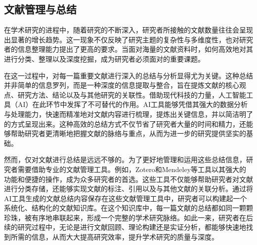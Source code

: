 \subsection{文献管理与总结}
在学术研究的进程中，随着研究的不断深入，研究者所接触的文献数量往往会呈现出显著的增长趋势。这一现象不仅反映了研究主题的复杂性与多维度性，也对研究者的信息整理能力提出了更高的要求。当面对海量的文献资料时，如何高效地对其进行分类、整理以及深度挖掘，成为研究者必须面对的重要课题。

在这一过程中，对每一篇重要文献进行深入的总结与分析显得尤为关键。这种总结并非简单的信息罗列，而是一种深度的信息提取与整合，旨在提炼文献的核心观点、研究方法、结论以及与其他研究的关联性。借助现代科技的力量，人工智能工具（AI）在此环节中发挥了不可替代的作用。AI工具能够凭借其强大的数据分析与处理能力，快速而精准地对文献内容进行梳理，提炼出关键信息，并以简洁明了的方式呈现出来。这种高效的总结方式不仅节省了研究者大量的时间和精力，还能够帮助研究者更清晰地把握文献的脉络与重点，从而为进一步的研究提供坚实的基础。

然而，仅对文献进行总结是远远不够的。为了更好地管理和运用这些总结信息，研究者需要借助专业的文献管理工具。例如，Zotero和Mendeley等工具以其强大的功能和便捷的操作，成为众多研究者的首选。这些工具不仅能够帮助研究者对文献进行分类存储，还能够实现文献的标注、引用以及与其他文献的关联分析。通过将AI工具生成的文献总结内容保存在这些文献管理工具中，研究者可以构建起一个系统化、结构化的文献知识库。在这个知识库中，每一篇文献的总结都如同一颗颗珍珠，被有序地串联起来，形成一个完整的学术研究脉络。如此一来，研究者在后续的研究过程中，无论是进行文献回顾、理论构建还是实证分析，都能够快速地找到所需的信息，从而大大提高研究效率，提升学术研究的质量与深度。

